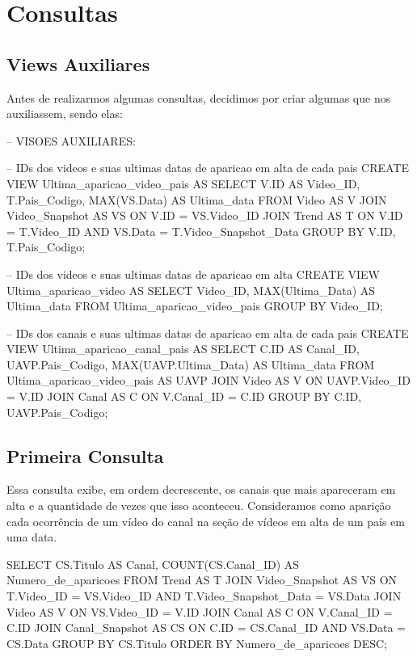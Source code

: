 \section{Consultas}

\subsection{Views Auxiliares}

  Antes de realizarmos algumas consultas, decidimos por criar algumas  que nos auxiliassem, sendo elas:

  \begin{code}
-- VISOES AUXILIARES:

-- IDs dos videos e suas ultimas datas de aparicao em alta de cada pais
CREATE VIEW Ultima_aparicao_video_pais AS
SELECT V.ID AS Video_ID, T.Pais_Codigo, MAX(VS.Data) AS Ultima_data
FROM Video AS V JOIN
    Video_Snapshot AS VS ON V.ID = VS.Video_ID JOIN
      Trend AS T ON V.ID = T.Video_ID AND
              VS.Data = T.Video_Snapshot_Data
GROUP BY V.ID, T.Pais_Codigo;

-- IDs dos videos e suas ultimas datas de aparicao em alta
CREATE VIEW Ultima_aparicao_video AS
SELECT Video_ID, MAX(Ultima_Data) AS Ultima_data
FROM Ultima_aparicao_video_pais
GROUP BY Video_ID;

-- IDs dos canais e suas ultimas datas de aparicao em alta de cada pais
CREATE VIEW Ultima_aparicao_canal_pais AS
SELECT C.ID AS Canal_ID, UAVP.Pais_Codigo, MAX(UAVP.Ultima_Data) AS Ultima_data
FROM Ultima_aparicao_video_pais AS UAVP JOIN
    Video AS V ON UAVP.Video_ID = V.ID JOIN
      Canal AS C ON V.Canal_ID = C.ID
GROUP BY C.ID, UAVP.Pais_Codigo;
  \end{code}

\subsection{Primeira Consulta}

  Essa consulta exibe, em ordem decrescente, os canais que mais apareceram em alta e a quantidade de vezes que isso aconteceu. Consideramos como aparição cada ocorrência de um vídeo do canal na seção de vídeos em alta de um país em uma data.

\begin{code}
SELECT CS.Titulo AS Canal, COUNT(CS.Canal_ID) AS Numero_de_aparicoes
FROM Trend AS T JOIN
    Video_Snapshot AS VS ON T.Video_ID = VS.Video_ID AND
                T.Video_Snapshot_Data = VS.Data JOIN
      Video AS V ON VS.Video_ID = V.ID JOIN
        Canal AS C ON V.Canal_ID = C.ID JOIN
          Canal_Snapshot AS CS ON C.ID = CS.Canal_ID AND
                      VS.Data = CS.Data
GROUP BY CS.Titulo
ORDER BY Numero_de_aparicoes DESC;
\end{code}

